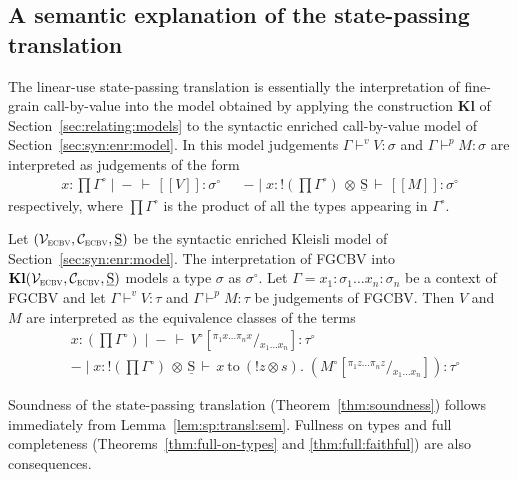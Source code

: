 \documentclass{LMCS}
\newcommand{\vj}[3]{#1 \mathrel{\vdash^{v}} #2 \colon \! #3}
\newcommand{\pj}[3]{#1 \mathrel{\vdash^p} #2 \colon \! #3}
\newcommand{\STA}{\sigma}
\newcommand{\STB}{\tau}
\newcommand{\co}{\colon}
\newcommand{\tensor}{\otimes}
\newcommand{\ltensortype}[2]{{!} #1 \, {\tensor} \, #2}
\newcommand{\ltensorterm}[2]{{!  #1} \tensor #2}
\newcommand{\letdot}[4]{{#3}\:\mathrm{to}\:{(\ltensorterm{#1}{#2})}.\;#4}
\newcommand{\rIn}[2]{#1 \colon  #2}
\newcommand{\aj}[4]{#1 \mid  \! #2 \, \vdash \, \rIn{#3}{#4}}
\newcommand{\tj}[3]{\aj{#1}{{-}}{#2}{#3}}
\newcommand{\CBVtoEEC}[1]{#1^{\circ}}
\DeclareMathOperator{\Prod}{\textstyle{\prod}}
\newcommand{\denlb}{[\![}
\newcommand{\denrb}{]\!]}
\newcommand{\den}[1]{\denlb{#1}\denrb}
\newcommand{\states}{{\underline{\mathrm{S}}}}
\newcommand{\SynEnrichedModel}{(\VSynE,\CSynE, \states)}
\newcommand{\VSynE}{\mathcal{V}_{\textsc{ecbv}}}
\newcommand{\CSynE}{\mathcal{C}_{\textsc{ecbv}}}
\newcommand{\Klmodel}{enriched Kleisli model}
\newcommand{\enrmodel}{enriched call-by-value model}
\newcommand{\ECBVToFreyd}{\mathbf{Kl}}
\newcommand{\sub}[3]{#1[^{#2}\!/\!_{#3}]}
\begin{document}
\subsection{A semantic explanation of the state-passing translation}
\label{sec:sp:transl:semantics}

The linear-use state-passing translation is essentially the
interpretation of fine-grain call-by-value into the model obtained
by applying the construction $\ECBVToFreyd$ of
Section~\ref{sec:relating:models} to the syntactic {\enrmodel} of
Section~\ref{sec:syn:enr:model}. In this model judgements
$\vj{\Gamma}{V}{\STA}$ and $\pj{\Gamma}{M}{\STA}$ are interpreted as
judgements of the form
\begin{align*}
\tj{x \co \Prod\CBVtoEEC{\Gamma}}{\den V}{\CBVtoEEC{\STA}} && \aj{-}{x \co \ltensortype{(\Prod\CBVtoEEC{\Gamma})}{\states}}{\den M}{\CBVtoEEC{\STA}}
\end{align*}
respectively, where $\Prod\CBVtoEEC{\Gamma}$ is the product of all the types appearing in $\CBVtoEEC{\Gamma}$.

\begin{lem} \label{lem:sp:transl:sem}
Let $\SynEnrichedModel$ be the syntactic {\Klmodel} of Section~\ref{sec:syn:enr:model}. 
The interpretation of FGCBV into $\ECBVToFreyd\SynEnrichedModel$ models a type $\STA$ as $\CBVtoEEC\STA$. Let $\Gamma = x_1 \co \STA_1 \dots x_n \co \STA_n$ be a context of FGCBV and let $\vj{\Gamma}{V}{\STB}$ and $\pj{\Gamma}{M}{\STB}$ be judgements of FGCBV. Then $V$ and $M$ are interpreted as the equivalence classes of the terms
\begin{align*}
&\tj{x \co (\Prod\CBVtoEEC{\Gamma})}{\sub{\CBVtoEEC V}{\pi_1x\dots \pi_nx}{x_1\dots x_n}}{\CBVtoEEC{\STB}} \\ 
&\aj{-}{x \co \ltensortype{(\Prod\CBVtoEEC{\Gamma})}{\states}}{\letdot{z}{s}{x}{(\sub{\CBVtoEEC M}{\pi_1z\dots \pi_nz}{x_1\dots x_n})}}{\CBVtoEEC{\STB}}
\end{align*}
\end{lem}

Soundness of the state-passing translation
(Theorem~\ref{thm:soundness}) follows immediately 
from Lemma~\ref{lem:sp:transl:sem}.
Fullness on types and 
full completeness (Theorems~\ref{thm:full-on-types} and \ref{thm:full:faithful})
are also  consequences.
\end{document}
